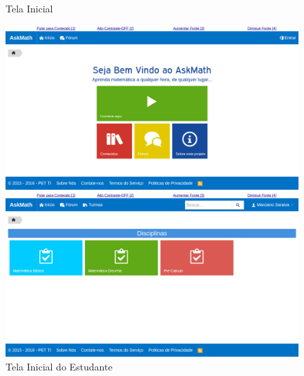 \begin{figure}[H]
  \centering
  \begin{minipage}[b]{0.49\textwidth}
	\caption{Tela Inicial}
    \includegraphics[width=\textwidth]{figuras/askmath/1}
  \end{minipage}
  \hfill
  \begin{minipage}[b]{0.49\textwidth}
	\caption{Tela Inicial do Estudante}
    \includegraphics[width=\textwidth]{figuras/askmath/2}
  \end{minipage}
 

\end{figure}
